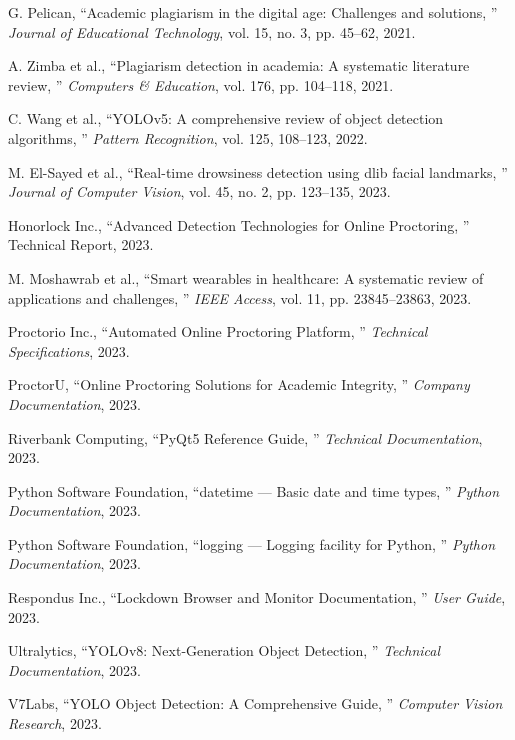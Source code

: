 \documentclass[conference]{IEEEtran}
\begin{document}
\begin{thebibliography}{99}
G. Pelican, ``Academic plagiarism in the digital age: Challenges and solutions, '' 
\textit{Journal of Educational Technology}, vol. 15, no. 3, pp. 45--62, 2021.

A. Zimba et al., ``Plagiarism detection in academia: A systematic literature 
review, '' \textit{Computers \& Education}, vol. 176, pp. 104--118, 2021.

C. Wang et al., ``YOLOv5: A comprehensive review of object detection algorithms, '' 
\textit{Pattern Recognition}, vol. 125, 108--123, 2022.

M. El-Sayed et al., ``Real-time drowsiness detection using dlib facial landmarks, '' 
\textit{Journal of Computer Vision}, vol. 45, no. 2, pp. 123--135, 2023.

Honorlock Inc., ``Advanced Detection Technologies for Online Proctoring, '' 
Technical Report, 2023.

M. Moshawrab et al., ``Smart wearables in healthcare: A systematic review of 
applications and challenges, '' \textit{IEEE Access}, vol. 11, pp. 23845--23863, 2023.

Proctorio Inc., ``Automated Online Proctoring Platform, '' 
\textit{Technical Specifications}, 2023.

ProctorU, ``Online Proctoring Solutions for Academic Integrity, '' 
\textit{Company Documentation}, 2023.

Riverbank Computing, ``PyQt5 Reference Guide, '' 
\textit{Technical Documentation}, 2023.

Python Software Foundation, ``datetime --- Basic date and time types, '' 
\textit{Python Documentation}, 2023.

Python Software Foundation, ``logging --- Logging facility for Python, '' 
\textit{Python Documentation}, 2023.

Respondus Inc., ``Lockdown Browser and Monitor Documentation, '' 
\textit{User Guide}, 2023.

Ultralytics, ``YOLOv8: Next-Generation Object Detection, '' 
\textit{Technical Documentation}, 2023.

V7Labs, ``YOLO Object Detection: A Comprehensive Guide, '' 
\textit{Computer Vision Research}, 2023.

\end{thebibliography}
\end{document}
